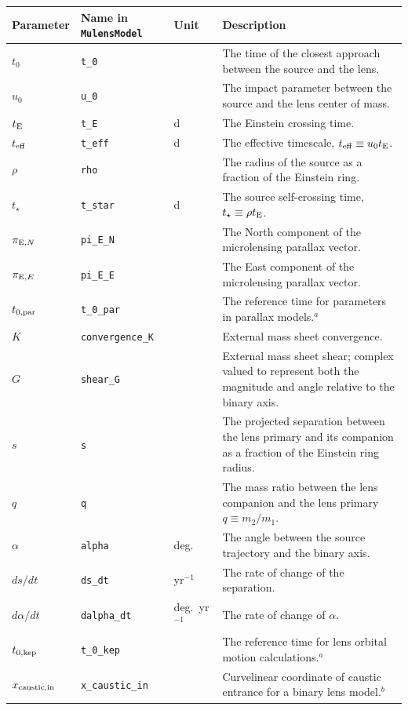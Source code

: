 \documentclass[12pt]{article}
\newcommand\MM{{\tt MulensModel}}
\begin{document}
\begin{landscape}
\captionsetup{width=20cm}
\begin{longtable}{l l l p{12cm}}
Parameter & Name in \MM &  Unit & Description \\
\hline
$t_0$ & {\tt t\_0} & & The time of the closest approach between the source and the lens. \\
$u_0$ & {\tt u\_0} & & The impact parameter between the source and the lens center of mass. \\
$t_{\rm E}$ & {\tt t\_E} & d & The Einstein crossing time. \\
$t_{\rm eff}$ & {\tt t\_eff} & d & The effective timescale, $t_{\rm eff} \equiv u_0 t_{\rm E}$. \\
$\rho$ & {\tt rho} & & The radius of the source as a fraction of the Einstein ring. \\
$t_{\star}$ & {\tt t\_star} & d & The source self-crossing time, $t_\star \equiv \rho t_{\rm E}$. \\
$\pi_{{\rm E}, N}$ & {\tt pi\_E\_N} & & The North component of the microlensing parallax vector. \\
$\pi_{{\rm E}, E}$ & {\tt pi\_E\_E} & & The East component of the microlensing parallax vector. \\
$t_{0,{\rm par}}$ & {\tt t\_0\_par} & & The reference time for parameters in parallax models.$^a$ \\
$K$ & {\tt convergence\_K} & & External mass sheet convergence. \\
$G$ & {\tt shear\_G} & & External mass sheet shear; complex valued to represent both the magnitude and angle relative to the binary axis. \\
$s$ & {\tt s} & & The projected separation between the lens primary and its companion as a fraction of the Einstein ring radius. \\
$q$ & {\tt q} & & The mass ratio between the lens companion and the lens primary $q \equiv m_2/m_1$. \\
$\alpha$ & {\tt alpha} & deg. & The angle between the source trajectory and the binary axis. \\
$ds/dt$ & {\tt ds\_dt} & yr$^{-1}$ & The rate of change of the separation. \\
$d\alpha/dt$ & {\tt dalpha\_dt} & deg.~yr$^{-1}$ & The rate of change of $\alpha$. \\
$t_{0,{\rm kep}}$ & {\tt t\_0\_kep} & & The reference time for lens orbital motion calculations.$^a$ \\
$x_{\rm caustic, in}$ & {\tt x\_caustic\_in} & & Curvelinear coordinate of caustic entrance for a binary lens model.$^b$ \\

\end{longtable}
\end{landscape}
\end{document}
